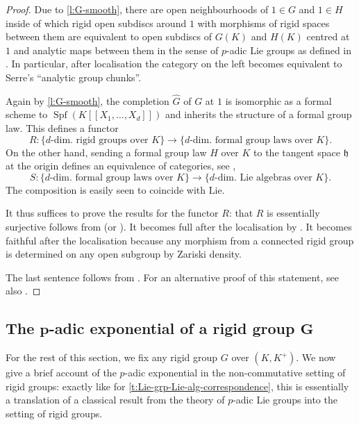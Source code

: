 \documentclass[11pt]{amsart}
\numberwithin{equation}{section}
\theoremstyle{definition}
\theoremstyle{remark}
\newcommand{\lra}{\longrightarrow}
\newcommand{\wh}{\widehat}
\newcommand{\Spf}{\operatorname{Spf}}
\begin{document}
\begin{proof}
	Due to \cref{l:G-smooth}, there are open neighbourhoods of $1\in G$ and $1\in H$ inside of which rigid open subdiscs around $1$ with morphisms of rigid spaces between them are equivalent to open subdiscs of $G(K)$ and $H(K)$ centred at $1$ and analytic maps between them in the sense of $p$-adic Lie groups as defined in \cite[Part~II, Chapter~II]{Serre_Lie}. In particular, after localisation the category on the left becomes  equivalent to Serre's ``analytic group chunks''.
	
	Again by \cref{l:G-smooth}, the completion $\wh G$ of $G$ at $1$ is isomorphic as a formal scheme to $\Spf(K[[X_1,\dots,X_d]])$ and inherits the structure of a formal group law. This defines a functor
	\[R\colon\{\text{$d$-dim.\ rigid groups over $K$}\}\lra \{\text{$d$-dim.\ formal group laws over $K$}\}.\]
	On the other hand, sending a formal group law $H$ over $K$ to the tangent space $\mathfrak h$ at the origin defines an equivalence of categories, see \cite[Part II, Chapter V.6]{Serre_Lie}, 
	\[S\colon\{\text{$d$-dim.\ formal group laws over $K$}\}\lra \{\text{$d$-dim.\ Lie algebras over $K$}\}.\] 
	The composition is easily seen to coincide with $\mathrm{Lie}$. 
	
	It thus suffices to prove the results for the functor $R$: that $R$ is essentially surjective follows from \cite[Part II, Chapter IV.8, Theorem~1]{Serre_Lie} (or \cite[Proposition 17.6]{Schneider_Lie}). It becomes full after the localisation by \cite[Part II, Chapter V.7, Theorem~1]{Serre_Lie}. It becomes faithful after the localisation because any morphism from a connected rigid group is determined on any open subgroup by Zariski density.
	
	The last sentence follows from \cite[Part II, Chapter V.7, Corollary~1.2]{Serre_Lie}.   For an alternative proof of this statement, see also \cite[Section~1, Lemmes 1 et~2]{Fargues-groupes-analytiques}.
\end{proof}


\subsection{The $\boldsymbol{p}$-adic exponential of a rigid group $\boldsymbol{G}$}\label{s:exp-log}
For the rest of this section, we fix any rigid group $G$ over $(K,K^+)$. 
We now give a brief account of the $p$-adic exponential in the non-commutative setting of rigid groups:  exactly like for \cref{t:Lie-grp-Lie-alg-correspondence}, this  is essentially a translation of a classical result from the theory of $p$-adic Lie groups into the setting of rigid groups. 
\end{document}
